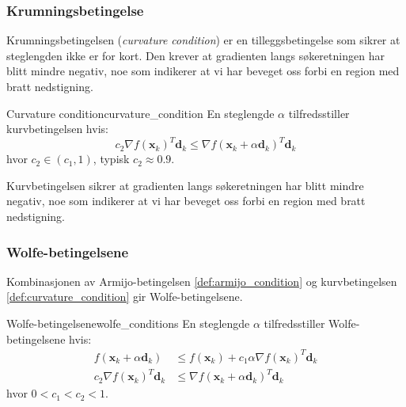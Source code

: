 \subsubsection{Krumningsbetingelse}
\label{subsubsec:curvature_condition}
Krumningsbetingelsen (\emph{curvature condition}) er en tilleggsbetingelse som sikrer at steglengden ikke er for kort. 
Den krever at gradienten langs søkeretningen har blitt mindre negativ, noe som indikerer at vi har beveget oss forbi en region med bratt nedstigning.

\begin{definition}{Curvature condition}{curvature_condition}
	En steglengde \(\alpha\) tilfredsstiller kurvbetingelsen hvis:
	\begin{equation}\label{eq:curvature_condition}
		c_2 \nabla f(\symbf{x}_k)^T \symbf{d}_k \leq \nabla f(\symbf{x}_k + \alpha \symbf{d}_k)^T \symbf{d}_k
	\end{equation}
	hvor \(c_2 \in (c_1, 1)\), typisk \(c_2 \approx 0.9\).
\end{definition}

Kurvbetingelsen sikrer at gradienten langs søkeretningen har blitt mindre negativ, noe som indikerer at vi har beveget oss forbi en region med bratt nedstigning.

\subsubsection{Wolfe-betingelsene}
\label{subsubsec:wolfe_conditions}

Kombinasjonen av Armijo-betingelsen \ref{def:armijo_condition} og kurvbetingelsen \ref{def:curvature_condition} gir Wolfe-betingelsene.

\begin{definition}{Wolfe-betingelsene}{wolfe_conditions}
	En steglengde \(\alpha\) tilfredsstiller Wolfe-betingelsene hvis:
	\begin{align}
		f(\symbf{x}_k + \alpha\symbf{d}_k)    & \leq f(\symbf{x}_k) + c_1\alpha\nabla f(\symbf{x}_k)^T\symbf{d}_k \tag{(Armijo)}    \\
		c_2\nabla f(\symbf{x}_k)^T\symbf{d}_k & \leq \nabla f(\symbf{x}_k + \alpha\symbf{d}_k)^T\symbf{d}_k  \tag{(Kurvbetingelse)}
	\end{align}
	hvor \(0 < c_1 < c_2 < 1\).
\end{definition}

